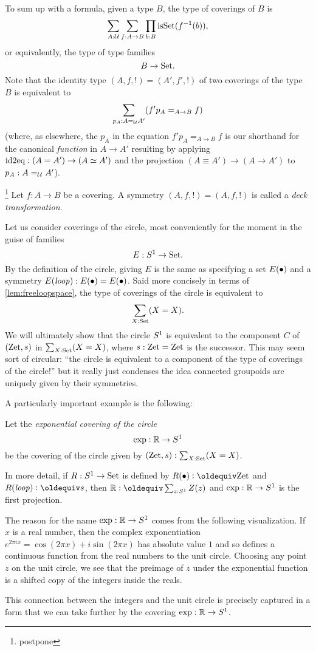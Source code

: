 To sum up with a formula, 
given a type $B$, the type of coverings of $B$ is
$$\sum_{A:\mathcal{U}}\sum_{f:A\to B}\prod_{b:B}\mathrm{isSet}(f^{-1}(b)),$$ 
or equivalently, the type of type families
$$B\to\mathord{\mathrm{Set}}.$$
Note that the identity type  $(A,f,!)=(A',f',!)$ of two coverings of the type $B$ is equivalent to 
$$\sum_{p_A:A=_{\mathcal{U}}A'}(f'p_A=_{A\to B}f)$$
(where, as elsewhere, the $p_A$ in the equation $f'p_A=_{A\to B}f$ is our shorthand for the canonical \emph{function} in $A\to A'$ resulting by applying $\mathrm{id2eq}:(A=A')\to (A\simeq A')$ and the projection $(A\equiv A')\to(A\to A')$ to $p_A:A=_{\mathcal{U}}A'$).
\begin{definition}\label{def:decktrafo}\footnote{postpone}
  Let $f:A\to B$ be a covering.  A symmetry $(A,f,!)=(A,f,!)$ is called a \emph{deck transformation}.
\end{definition}

\begin{remark}
  \label{xca:coveringsofS1}
  Let us consider coverings of the circle, most conveniently for the moment in the guise of families 
$$E:S^1\to\mathord{\mathrm{Set}}.$$
By the definition of the circle, giving $E$ is the same as specifying a set $E(\bullet)$ and a symmetry $E(\mathit{loop}):E(\bullet)=E(\bullet)$.  Said more concisely in terms of \cref{lem:freeloopspace}, the type of coverings of the circle is equivalent to 
$$\sum_{X:\mathord{\mathrm{Set}}}(X=X).$$
We will ultimately show that the circle $S^1$ is equivalent to the component $C$ of $(\mathrm{Zet},s)$ in $\sum_{X:\mathord{\mathrm{Set}}}(X=X)$,  where $s:\mathrm{Zet}=\mathrm{Zet}$ is the successor.  This may seem sort of circular: ``the circle is equivalent to a component of the type of coverings of the circle!'' but it really just condenses the idea connected groupoids are uniquely given by their symmetries.
\end{remark}
A particularly important example is the following:
\begin{definition}
  \label{def:RtoS1}
  Let the \emph{exponential covering of the circle}
$$\exp:\mathbb R\to S^1$$ 
be the covering of the circle given by $(\mathrm{Zet},s):\sum_{X:\mathord{\mathrm{Set}}}(X=X)$.  
\end{definition}

In more detail, if $R:S^1\to\mathord{\mathrm{Set}}$ is defined by $R(\base)\defequi\zet$ and $R(\Sloop)\defequi s$, then $\mathbb R\defequi\sum_{z:\Sc}Z(z)$ and $\exp:\mathbb R\to S^1$ is the first projection.

\begin{remark}
  \label{rem:expforreal}
  The reason for the name $\exp:\mathbb R\to S^1$ comes from the following visualization.  
If $x$ is a real number, then the complex exponentiation $e^{2\pi i x}=\cos(2\pi x)+i\sin(2\pi x)$ has absolute value $1$ and so defines a continuous function from the real numbers to the unit circle.  
Choosing any point $z$ on the unit circle, we see that the preimage of $z$ under the exponential function is a shifted copy of the integers inside the reals. 
 
This connection between the integers and the unit circle is precisely captured in a form that we can take further by the covering $\exp:\mathbb R\to S^1$.
\end{remark}

